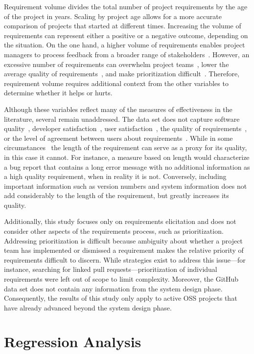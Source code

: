 Requirement volume divides the total number of project requirements by the age of the project in years. Scaling by project age allows for a more accurate comparison of projects that started at different times. Increasing the volume of requirements can represent either a positive or a negative outcome, depending on the situation. On the one hand, a higher volume of requirements enables project managers to process feedback from a broader range of stakeholders~\cite{hosseini}. However, an excessive number of requirements can overwhelm project teams~\cite{groen}, lower the average quality of requirements~\cite{groen}, and make prioritization difficult~\cite{stakerare, stakenet}. Therefore, requirement volume requires additional context from the other variables to determine whether it helps or hurts.

Although these variables reflect many of the  measures of effectiveness in the literature, several remain unaddressed. The data set does not capture software quality~\cite{stewart}, developer satisfaction~\cite{ghapanchi}, user satisfaction~\cite{ghapanchi}, the quality of requirements~\cite{ma}, or the level of agreement between users about requirements~\cite{ma}. While in some circumstances~\cite{pagano} the length of the requirement can serve as a proxy for its quality, in this case it cannot. For instance, a measure based on length would characterize a bug report that contains a long error message with no additional information as a high quality requirement, when in reality it is not. Conversely, including important information such as version numbers and system information does not add considerably to the length of the requirement, but greatly increases its quality.

Additionally, this study focuses only on requirements elicitation and does not consider other aspects of the requirements process, such as prioritization. Addressing prioritization is difficult because ambiguity about whether a project team has implemented or dismissed a requirement makes the relative priority of requirements difficult to discern. While strategies exist to address this issue---for instance, searching for linked pull requests---prioritization of individual requirements were left out of scope to limit complexity. Moreover, the GitHub data set does not contain any information from the system design phase. Consequently, the results of this study only apply to active OSS projects that have already advanced beyond the system design phase.

\section{Regression Analysis}


